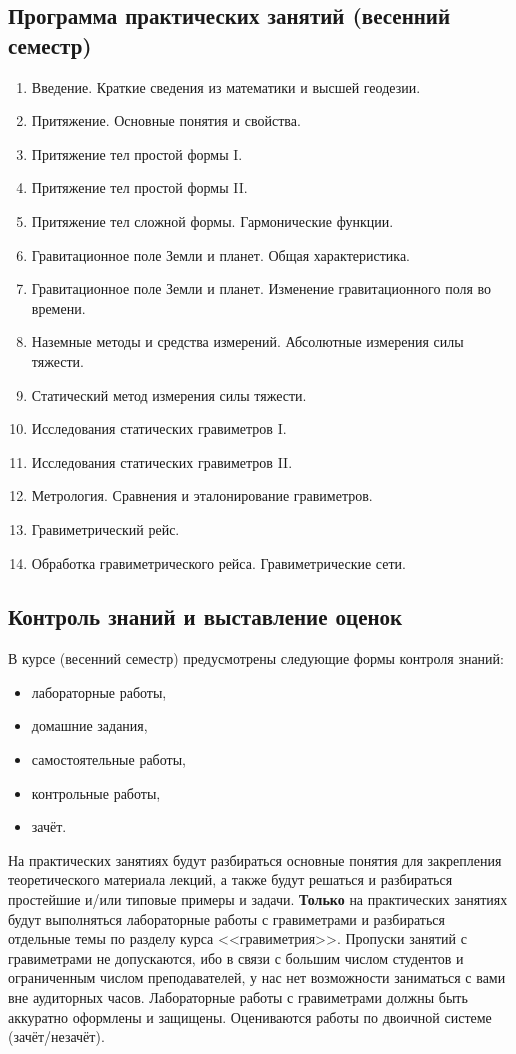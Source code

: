 \documentclass[11pt, a4paper]{article}
\theoremstyle{plain}
\theoremstyle{definition}
\theoremstyle{remark}
\begin{document}
\subsection{Программа практических занятий (весенний семестр)}
\begin{enumerate}
    \item Введение. Краткие сведения из математики и высшей геодезии.
    \item Притяжение. Основные понятия и свойства.
    \item Притяжение тел простой формы I.
    \item Притяжение тел простой формы II.
    \item Притяжение тел сложной формы. Гармонические функции.
    \item Гравитационное поле Земли и планет. Общая характеристика.
    \item Гравитационное поле Земли и планет. Изменение гравитационного поля во времени.
    \item Наземные методы и средства измерений. Абсолютные измерения силы тяжести.
    \item Статический метод измерения силы тяжести.
    \item Исследования статических гравиметров I.
    \item Исследования статических гравиметров II.
    \item Метрология. Сравнения и эталонирование гравиметров.
    \item Гравиметрический рейс.
    \item Обработка гравиметрического рейса. Гравиметрические сети.
\end{enumerate}

\subsection{Контроль знаний и выставление оценок}
В курсе (весенний семестр) предусмотрены следующие формы контроля знаний: 
\begin{itemize}
    \item лабораторные работы,
    \item домашние задания,
    \item самостоятельные работы,
    \item контрольные работы,
    \item зачёт.
\end{itemize}

На практических занятиях будут разбираться основные понятия для закрепления теоретического материала
лекций, а также будут решаться и разбираться простейшие и/или типовые примеры и задачи.
\textbf{Только} на
практических занятиях будут выполняться лабораторные работы с гравиметрами и разбираться отдельные
темы по разделу курса <<гравиметрия>>. Пропуски занятий с гравиметрами не допускаются, ибо в связи с
большим числом студентов и ограниченным числом преподавателей, у нас нет возможности заниматься с
вами вне аудиторных часов. Лабораторные работы с гравиметрами должны быть аккуратно оформлены и
защищены. Оцениваются работы по двоичной системе (зачёт/незачёт).
\end{document}
